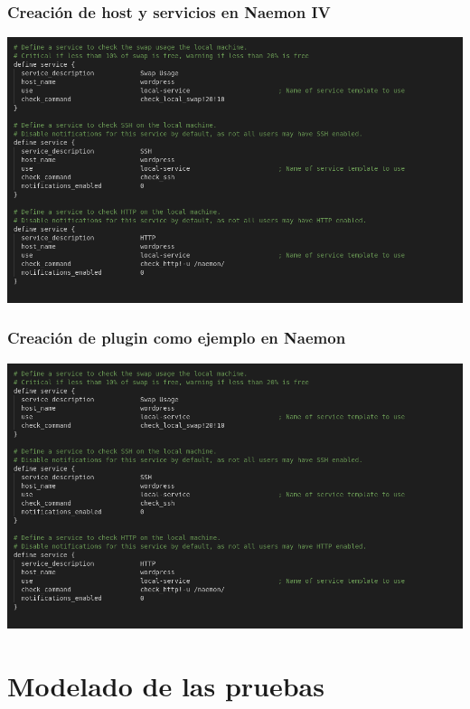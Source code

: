 \documentclass{beamer}
\theoremstyle{plain}
\theoremstyle{definition}
\theoremstyle{plain}
\theoremstyle{definition}
\theoremstyle{remark}
\theoremstyle{definition}
\begin{document}
\begin{frame}
	\frametitle{Creación de host y servicios en Naemon IV}
	
	
	\centering
	\includegraphics[scale=0.3]{imagenes/analisis_naemon/services2.png}
	
\end{frame}
\begin{frame}
	\frametitle{Creación de plugin como ejemplo en Naemon}
	\centering
	\includegraphics[scale=0.3]{imagenes/analisis_naemon/services2.png}
	
\end{frame}



\section{Modelado de las pruebas} %
\end{document}
